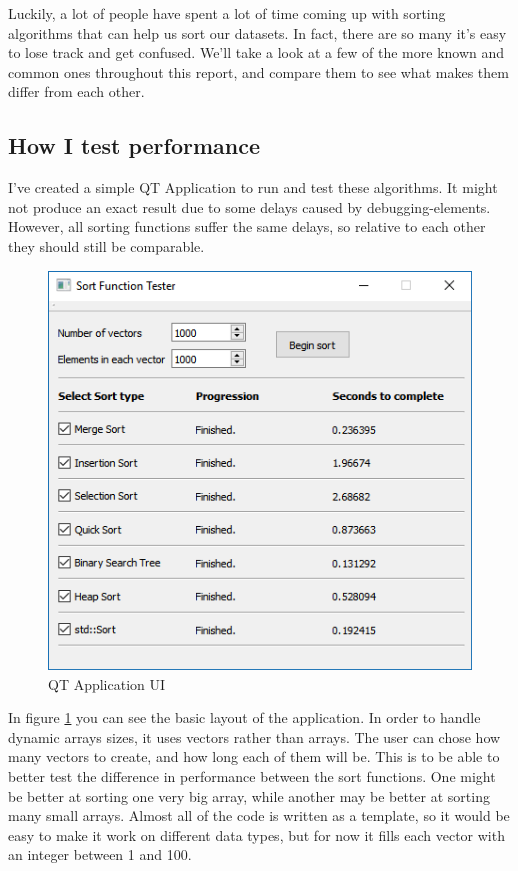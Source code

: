 \documentclass{article}
\begin{document}
Luckily, a lot of people have spent a lot of time coming up with sorting algorithms that can help us sort our datasets. In fact, there are so many it's easy to lose track and get confused. We'll take a look at a few of the more known and common ones throughout this report, and compare them to see what makes them differ from each other.

	\newpage
\subsection{How I test performance}

I've created a simple QT Application to run and test these algorithms. It might not produce an exact result due to some delays caused by debugging-elements. However, all sorting functions suffer the same delays, so relative to each other they should still be comparable. 

\begin{figure}[h]
	\centering
	\includegraphics[width=0.7\linewidth]{images/UI}
	\caption[QT Application UI]{QT Application UI}
	\label{fig:ui}
\end{figure}

In figure \ref{fig:ui} you can see the basic layout of the application. In order to handle dynamic arrays sizes, it uses vectors rather than arrays. The user can chose how many vectors to create, and how long each of them will be. This is to be able to better test the difference in performance between the sort functions. One might be better at sorting one very big array, while another may be better at sorting many small arrays. Almost all of the code is written as a template, so it would be easy to make it work on different data types, but for now it fills each vector with an integer between 1 and 100.
\end{document}
